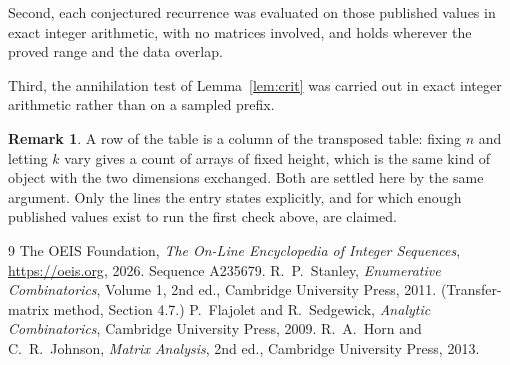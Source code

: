 \documentclass[11pt,a4paper]{article}
\theoremstyle{plain}
\theoremstyle{definition}
\newtheorem{remark}[theorem]{Remark}
\begin{document}
Second, each conjectured recurrence was evaluated on those published values in exact
integer arithmetic, with no matrices involved, and holds wherever the proved range and the
data overlap.

Third, the annihilation test of Lemma~\ref{lem:crit} was carried out in exact integer
arithmetic rather than on a sampled prefix.

\begin{remark}
A row of the table is a column of the transposed table: fixing $n$ and letting $k$ vary gives a
count of arrays of fixed height, which is the same kind of object with the two dimensions
exchanged. Both are settled here by the same argument. Only the lines the entry states
explicitly, and for which enough published values exist to run the first check above, are
claimed.
\end{remark}

\begin{thebibliography}{9}
 The OEIS Foundation, \emph{The On-Line Encyclopedia of Integer
Sequences}, \url{https://oeis.org}, 2026. Sequence A235679.
 R.~P.~Stanley, \emph{Enumerative Combinatorics}, Volume 1, 2nd ed.,
Cambridge University Press, 2011. (Transfer-matrix method, Section 4.7.)
 P.~Flajolet and R.~Sedgewick, \emph{Analytic Combinatorics}, Cambridge
University Press, 2009.
 R.~A.~Horn and C.~R.~Johnson, \emph{Matrix Analysis}, 2nd ed., Cambridge
University Press, 2013.
\end{thebibliography}
\end{document}

